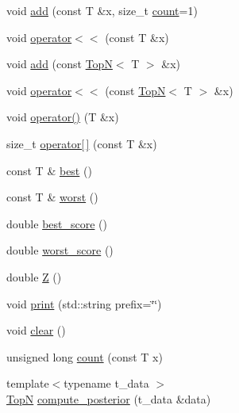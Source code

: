 \begin{DoxyCompactItemize}
\item 
void \hyperlink{class_fleet_1_1_statistics_1_1_top_n_a71f34724832a34c029bfeeb6e1dea24f}{add} (const T \&x, size\+\_\+t \hyperlink{class_fleet_1_1_statistics_1_1_top_n_a341df027d3283fe3a9bf3766521e126d}{count}=1)
\item 
void \hyperlink{class_fleet_1_1_statistics_1_1_top_n_af54651d8e83bdcc6b3ffbcef3aa3fd6e}{operator$<$$<$} (const T \&x)
\item 
void \hyperlink{class_fleet_1_1_statistics_1_1_top_n_ac1a720c5f52f0486377274bd1e6a052a}{add} (const \hyperlink{class_fleet_1_1_statistics_1_1_top_n}{TopN}$<$ T $>$ \&x)
\item 
void \hyperlink{class_fleet_1_1_statistics_1_1_top_n_a73cb4911b6dc2bdc56f466ca4b93ef9d}{operator$<$$<$} (const \hyperlink{class_fleet_1_1_statistics_1_1_top_n}{TopN}$<$ T $>$ \&x)
\item 
void \hyperlink{class_fleet_1_1_statistics_1_1_top_n_a3300639fe8eef303fb66e1630dc0790c}{operator()} (T \&x)
\item 
size\+\_\+t \hyperlink{class_fleet_1_1_statistics_1_1_top_n_acb11e623b45dbec10f2c1ac9a48b0eef}{operator\mbox{[}$\,$\mbox{]}} (const T \&x)
\item 
const T \& \hyperlink{class_fleet_1_1_statistics_1_1_top_n_a61aa70a203ecf97f79d26cb4bcfe2071}{best} ()
\item 
const T \& \hyperlink{class_fleet_1_1_statistics_1_1_top_n_a7be596fb7defba492b503371c58b30ce}{worst} ()
\item 
double \hyperlink{class_fleet_1_1_statistics_1_1_top_n_a2881453d64d161d43d55eacdfc97627c}{best\+\_\+score} ()
\item 
double \hyperlink{class_fleet_1_1_statistics_1_1_top_n_abb7a4016cfe775eb7b5058f1dd8edd0d}{worst\+\_\+score} ()
\item 
double \hyperlink{class_fleet_1_1_statistics_1_1_top_n_aa94e0f1e4df0ba70b35abcc540b7cb03}{Z} ()
\item 
void \hyperlink{class_fleet_1_1_statistics_1_1_top_n_ae37eb4f39eb12d32a1f04aa30276da86}{print} (std\+::string prefix=\char`\"{}\char`\"{})
\item 
void \hyperlink{class_fleet_1_1_statistics_1_1_top_n_ab57188b1858802dcf1f26dbcf702c6ae}{clear} ()
\item 
unsigned long \hyperlink{class_fleet_1_1_statistics_1_1_top_n_a341df027d3283fe3a9bf3766521e126d}{count} (const T x)
\item 
{\footnotesize template$<$typename t\+\_\+data $>$ }\\\hyperlink{class_fleet_1_1_statistics_1_1_top_n}{TopN} \hyperlink{class_fleet_1_1_statistics_1_1_top_n_ac6ab403d6833e58352e24110ee379fbf}{compute\+\_\+posterior} (t\+\_\+data \&data)
\end{DoxyCompactItemize}
